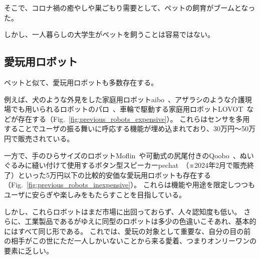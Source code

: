 \documentclass[uplatex,a4paper,12pt]{jsarticle}
\renewcommand{\figurename}{Fig.}
\newcommand{\figref}[1]{\figurename~\ref{#1}}
\begin{document}
そこで、コロナ禍の癒やしや巣ごもり需要として、ペットの飼育がブームとなった。

しかし、一人暮らしの大学生がペットを飼うことは容易ではない。


\subsection{愛玩用ロボット}
ペットと似て、愛玩用ロボットも多数存在する。

例えば、犬のような外見をした家庭用ロボットaibo~\cite{web_aibo}、アザラシのような介護現場でも用いられるロボットのパロ~\cite{web_paro}、車輪で駆動する家庭用ロボットLOVOT~\cite{web_lovot}などが存在する（\figref{fig:previous_robots_expensive}）。
これらはセンサを多用することでユーザの振る舞いに呼応する機能が埋め込まれており、30万円～50万円で販売されている。

一方で、手のひらサイズのロボットMoflin~\cite{web_moflin}や可動式の尻尾付きのQoobo~\cite{web_qoobo}、ぬいぐるみに縫い付けて使用するボタン型スピーカーpechat~\cite{web_pechat}（※2024年2月で販売終了）といった5万円以下の比較的安価な愛玩用ロボットも存在する（\figref{fig:previous_robots_inexpensive}）。
これらは機能や用途を限定しつつもユーザに安らぎや楽しみをもたらすことを目指している。

しかし、これらロボットはまだ市場に出回っておらず、人々認知度も低い。
さらに、工業製品であるがゆえに同型のロボットは多少の色違いこそあれ、基本的にはすべて同じ形である。
これでは、愛玩の対象として重要な、自分の目の前の相手がこの世にただ一人しかいないことから来る愛着、つまりオンリーワンの要素に乏しい。
\end{document}
